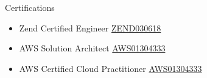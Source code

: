 \documentclass{resume} %
\begin{document}
\begin{rSection}{Certifications}
 \begin{itemize}
    \itemsep -3pt {} 
\item Zend Certified Engineer \href{https://www.zend-zce.com/en/yellow-pages/ZEND030618}{ZEND030618}
\item AWS Solution Architect \href{https://www.credly.com/badges/8f5d753b-386f-4384-b2d4-3116c97278b4/public_url}{AWS01304333}
\item AWS Certified Cloud Practitioner \href{https://www.credly.com/badges/5f197609-78e4-424c-a85f-0a3eda380df9/public_url}{AWS01304333}
\end{itemize}
\end{rSection} 
\end{document}
